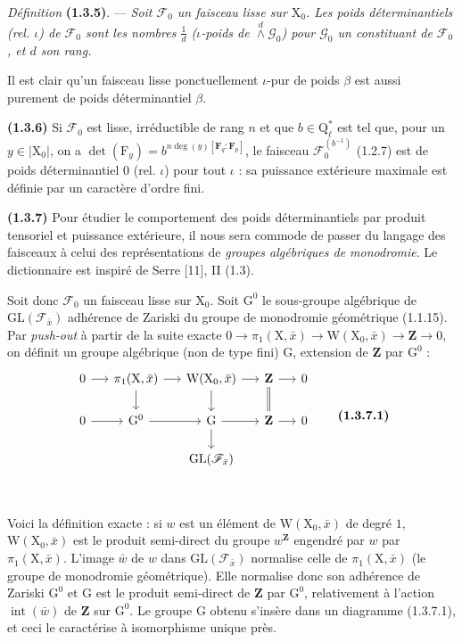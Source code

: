 \documentclass[11pt,leqno]{article}
\newcommand{\Page}[1]{\ifvmode\noindent\else\unskip\ \fi{\footnotesize\textcolor{gray}{[p.\,#1]}}\ \ignorespaces}
\begin{document}
\textit{Définition} \textbf{(1.3.5)}. — \textit{Soit \(\mathscr{F}_0\) un faisceau lisse sur \(\mathrm{X}_0\). Les \textup{poids déterminantiels (rel. \(\iota\))} de \(\mathscr{F}_0\) sont les nombres \(\frac{1}{d}\) \textup{(\(\iota\)-poids de \(\overset{d}{\wedge}\mathscr{G}_0\))} pour \(\mathscr{G}_0\) un constituant de \(\mathscr{F}_0\), et \(d\) son rang.}

Il est clair qu’un faisceau lisse ponctuellement \(\iota\)-pur de poids \(\beta\) est aussi purement de poids déterminantiel \(\beta\).

\textbf{(1.3.6)} Si \(\mathscr{F}_0\) est lisse, irréductible de rang \(n\) et que \(b\in\mathrm{Q}_\ell^*\) est tel que, pour un \(y\in|\mathrm{X}_0|\), on a \(\det(\mathrm{F}_y)=b^{n\deg(y)[\mathbf{F}_q:\mathbf{F}_p]}\), le faisceau \(\mathscr{F}_0^{(b^{-1})}\) (1.2.7) est de poids déterminantiel \(0\) (rel. \(\iota\)) pour tout \(\iota\) : sa puissance extérieure maximale est définie par un caractère d’ordre fini.

\textbf{(1.3.7)} Pour étudier le comportement des poids déterminantiels par produit tensoriel et puissance extérieure, il nous sera commode de passer du langage des faisceaux à celui des représentations de \textit{groupes algébriques de monodromie}. Le dictionnaire est inspiré de Serre [11], II (1.3).

Soit donc \(\mathscr{F}_0\) un faisceau lisse sur \(\mathrm{X}_0\). Soit \(\mathrm{G}^0\) le sous-groupe algébrique de \(\mathrm{GL}(\mathscr{F}_{\bar{x}})\) adhérence de Zariski du groupe de monodromie géométrique (1.1.15). Par \textit{push-out} à partir de la suite exacte \(0\to\pi_1(\mathrm{X},\bar{x})\to\mathrm{W}(\mathrm{X}_0,\bar{x})\to\mathbf{Z}\to0\), on définit un groupe algébrique (non de type fini) \(\mathrm{G}\), extension de \(\mathbf{Z}\) par \(\mathrm{G}^0\) :
\[
\begin{tikzcd}[column sep=1.4em,row sep=1.6em]
0 \arrow[r]
  & \pi_1(\mathrm{X},\bar{x}) \arrow[r] \arrow[d]
  & \mathrm{W}(\mathrm{X}_0,\bar{x}) \arrow[r] \arrow[d]
  & \mathbf{Z} \arrow[r] \arrow[d,equal]
  & 0 \\
0 \arrow[r]
  & \mathrm{G}^0 \arrow[r]
  & \mathrm{G} \arrow[r] \arrow[d]
  & \mathbf{Z} \arrow[r]
  & 0 \\
  & & \mathrm{GL}(\mathscr{F}_{\bar{x}})
\end{tikzcd}
\tag*{\textbf{(1.3.7.1)}}
\]

\Page{159}

Voici la définition exacte : si \(w\) est un élément de \(\mathrm{W}(\mathrm{X}_0,\bar{x})\) de degré \(1\), \(\mathrm{W}(\mathrm{X}_0,\bar{x})\) est le produit semi-direct du groupe \(w^{\mathbf{Z}}\) engendré par \(w\) par \(\pi_1(\mathrm{X},\bar{x})\). L’image \(\bar{w}\) de \(w\) dans \(\mathrm{GL}(\mathscr{F}_{\bar{x}})\) normalise celle de \(\pi_1(\mathrm{X},\bar{x})\) (le groupe de monodromie géométrique). Elle normalise donc son adhérence de Zariski \(\mathrm{G}^0\) et \(\mathrm{G}\) est le produit semi-direct de \(\mathbf{Z}\) par \(\mathrm{G}^0\), relativement à l’action \(\operatorname{int}(\bar{w})\) de \(\mathbf{Z}\) sur \(\mathrm{G}^0\). Le groupe \(\mathrm{G}\) obtenu s’insère dans un diagramme (1.3.7.1), et ceci le caractérise à isomorphisme unique près.
\end{document}
